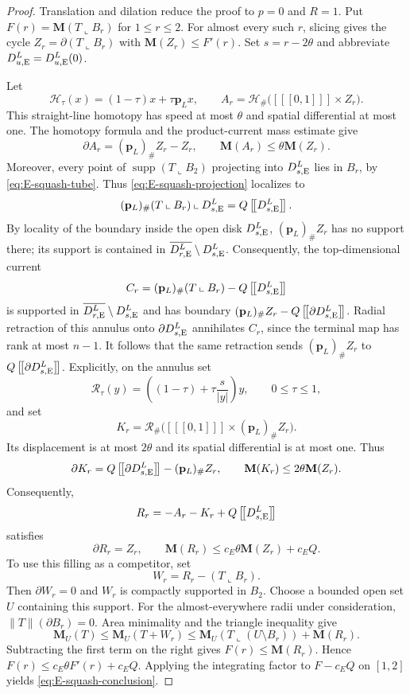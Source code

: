 \documentclass[11pt,reqno]{amsart}
\numberwithin{equation}{section}
\theoremstyle{definition}
\theoremstyle{remark}
\newcommand{\Mass}{\mathbf M}
\newcommand{\supp}{\operatorname{supp}}
\newcommand{\restr}{\mathbin{\llcorner}}
\newcommand{\cur}[1]{\left[\!\left[#1\right]\!\right]}
\begin{document}
\begin{proof}
Translation and dilation reduce the proof to $p=0$ and $R=1$.  Put
$F(r)=\Mass(T\restr B_r)$ for $1\le r\le2$.  For almost every such $r$,
slicing gives the cycle $Z_r=\partial(T\restr B_r)$ with
$\Mass(Z_r)\le F'(r)$.  Set $s=r-2\theta$ and abbreviate
$D_{u,{\rm E}}^L=D_{u,{\rm E}}^L(0)$.

Let
\[
 \mathcal H_\tau(x)=(1-\tau)x+\tau\mathbf p_Lx,
 \qquad
 A_r=\mathcal H_\#\bigl(\cur{[0,1]}\times Z_r\bigr).
\]
This straight-line homotopy has speed at most $\theta$ and spatial
differential at most one.  The homotopy formula and the product-current mass
estimate give
\[
 \partial A_r=(\mathbf p_L)_\#Z_r-Z_r,
 \qquad
 \Mass(A_r)\le\theta\Mass(Z_r).
\]
Moreover, every point of
$\supp(T\restr B_2)$ projecting into $D_{s,{\rm E}}^L$ lies in $B_r$, by
\eqref{eq:E-squash-tube}.  Thus \eqref{eq:E-squash-projection} localizes to
\[
 (\mathbf p_L)_\#(T\restr B_r)\restr D_{s,{\rm E}}^L
 =Q\cur{D_{s,{\rm E}}^L}.
\]
By locality of the boundary inside the open disk $D_{s,{\rm E}}^L$,
$(\mathbf p_L)_\#Z_r$ has no support there; its support is contained in
$\overline{D_{r,{\rm E}}^L}\setminus D_{s,{\rm E}}^L$.  Consequently, the
top-dimensional current
\[
 C_r=(\mathbf p_L)_\#(T\restr B_r)-Q\cur{D_{s,{\rm E}}^L}
\]
is supported in $\overline{D_{r,{\rm E}}^L}\setminus D_{s,{\rm E}}^L$ and has
boundary $(\mathbf p_L)_\#Z_r-Q\cur{\partial D_{s,{\rm E}}^L}$.  Radial
retraction of this annulus onto $\partial D_{s,{\rm E}}^L$ annihilates $C_r$,
since the terminal map has
rank at most $n-1$.  It follows that the same retraction sends
$(\mathbf p_L)_\#Z_r$ to $Q\cur{\partial D_{s,{\rm E}}^L}$.  Explicitly, on
the annulus set
\[
 \mathcal R_\tau(y)=
 \left((1-\tau)+\tau\frac{s}{|y|}\right)y,
 \qquad 0\le\tau\le1,
\]
and set
\[
 K_r=\mathcal R_\#\bigl(
       \cur{[0,1]}\times(\mathbf p_L)_\#Z_r\bigr).
\]
Its displacement is at most $2\theta$ and its spatial differential is at
most one.  Thus
\[
 \partial K_r=Q\cur{\partial D_{s,{\rm E}}^L}-(\mathbf p_L)_\#Z_r,
 \qquad
 \Mass(K_r)\le2\theta\Mass(Z_r).
\]
Consequently,
\[
 R_r=-A_r-K_r+Q\cur{D_{s,{\rm E}}^L}
\]
satisfies
\[
 \partial R_r=Z_r,
 \qquad
 \Mass(R_r)\le c_E\theta\Mass(Z_r)+c_EQ.
\]
To use this filling as a competitor, set
\[
 W_r=R_r-(T\restr B_r).
\]
Then $\partial W_r=0$ and $W_r$ is compactly supported in $B_2$.  Choose a
bounded open set $U$ containing this support.  For the almost-everywhere
radii under consideration, $\|T\|(\partial B_r)=0$.  Area minimality and the
triangle inequality give
\[
 \Mass_U(T)
 \le \Mass_U(T+W_r)
 \le \Mass_U(T\restr(U\setminus B_r))+\Mass(R_r).
\]
Subtracting the first term on the right gives $F(r)\le\Mass(R_r)$.  Hence
$F(r)\le c_E\theta F'(r)+c_EQ$.  Applying the integrating factor to
$F-c_EQ$ on $[1,2]$ yields \eqref{eq:E-squash-conclusion}.
\end{proof}
\end{document}
